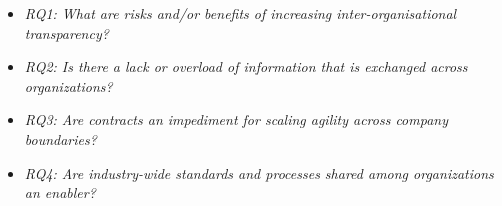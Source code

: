 %

\begin{itemize}
\item {\em RQ1: What are risks and/or benefits of increasing inter-organisational transparency?}
\item {\em RQ2: Is there a lack or overload of information that is exchanged across organizations?} 
\item {\em RQ3: Are contracts an impediment for scaling agility across company boundaries?} %
\item {\em RQ4: Are industry-wide standards and processes shared among organizations an enabler?}
\end{itemize}

